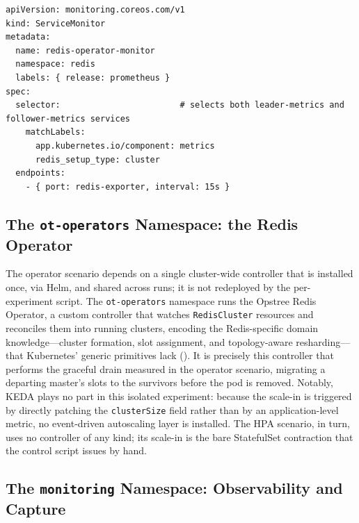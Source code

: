 \begin{lstlisting}[caption={Standalone \texttt{ServiceMonitor} for the operator's exporters (\texttt{redis-servicemonitor.yaml}).},label={lst:servicemonitor-operator}]
apiVersion: monitoring.coreos.com/v1
kind: ServiceMonitor
metadata:
  name: redis-operator-monitor
  namespace: redis
  labels: { release: prometheus }
spec:
  selector:                        # selects both leader-metrics and follower-metrics services
    matchLabels:
      app.kubernetes.io/component: metrics
      redis_setup_type: cluster
  endpoints:
    - { port: redis-exporter, interval: 15s }
\end{lstlisting}

\subsection{The \texttt{ot-operators} Namespace: the Redis Operator}
\label{subsubsec:ns-operator}

The operator scenario depends on a single cluster-wide controller that is installed once, via
Helm, and shared across runs; it is not redeployed by the per-experiment script. The
\texttt{ot-operators} namespace runs the Opstree Redis Operator, a custom controller that
watches \texttt{RedisCluster} resources and reconciles them into running clusters, encoding
the Redis-specific domain knowledge---cluster formation, slot assignment, and topology-aware
resharding---that Kubernetes' generic primitives lack (\cite{k8s:operator}). It is precisely
this controller that performs the graceful drain measured in the operator scenario, migrating
a departing master's slots to the survivors before the pod is removed. Notably, KEDA plays no
part in this isolated experiment: because the scale-in is triggered by directly patching the
\texttt{clusterSize} field rather than by an application-level metric, no event-driven
autoscaling layer is installed. The HPA scenario, in turn, uses no controller of any kind;
its scale-in is the bare StatefulSet contraction that the control script issues by hand.

\subsection{The \texttt{monitoring} Namespace: Observability and Capture}
\label{subsubsec:ns-monitoring}

